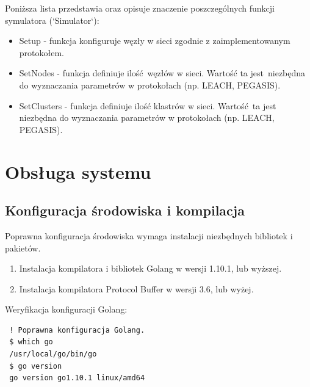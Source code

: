 \documentclass[a4paper,12pt,twoside,openany]{report}
\begin{document}
Poniższa lista przedstawia oraz opisuje znaczenie poszczególnych funkcji symulatora (`Simulator`):

\begin{itemize}
 \item Setup - funkcja konfiguruje węzły w sieci zgodnie z zaimplementowanym protokołem.
 \item SetNodes - funkcja definiuje ilość węzłów w sieci. Wartość ta jest niezbędna do wyznaczania parametrów w protokołach (np. LEACH, PEGASIS).
 \item SetClusters - funkcja definiuje ilość klastrów w sieci. Wartość ta jest niezbędna do wyznaczania parametrów w protokołach (np. LEACH, PEGASIS).
\end{itemize}




\section{Obsługa systemu}
 
\subsection{Konfiguracja środowiska i kompilacja}

Poprawna konfiguracja środowiska wymaga instalacji niezbędnych bibliotek i pakietów.

\begin{enumerate}
 \item Instalacja kompilatora i bibliotek Golang w wersji 1.10.1, lub wyższej.
 \item Instalacja kompilatora Protocol Buffer w wersji 3.6, lub wyżej.
\end{enumerate}

Weryfikacja konfiguracji Golang:

\begin{lstlisting}
 ! Poprawna konfiguracja Golang.
 $ which go
 /usr/local/go/bin/go
 $ go version
 go version go1.10.1 linux/amd64
\end{lstlisting}
\end{document}

